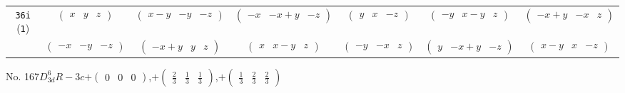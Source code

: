 \documentclass[fleqn,9pt,landscape]{jsarticle}
\begin{document}
\begin{center}
\begin{longtable}{ccccccc}
{\tt 36i} ({\tt 1}) & $ \begin{pmatrix} x & y & z \end{pmatrix} $ & $ \begin{pmatrix} x - y & - y & - z \end{pmatrix} $ & $ \begin{pmatrix} - x & - x + y & - z \end{pmatrix} $ & $ \begin{pmatrix} y & x & - z \end{pmatrix} $ & $ \begin{pmatrix} - y & x - y & z \end{pmatrix} $ & $ \begin{pmatrix} - x + y & - x & z \end{pmatrix} $ \\
& $ \begin{pmatrix} - x & - y & - z \end{pmatrix} $ & $ \begin{pmatrix} - x + y & y & z \end{pmatrix} $ & $ \begin{pmatrix} x & x - y & z \end{pmatrix} $ & $ \begin{pmatrix} - y & - x & z \end{pmatrix} $ & $ \begin{pmatrix} y & - x + y & - z \end{pmatrix} $ & $ \begin{pmatrix} x - y & x & - z \end{pmatrix} $ \\
\end{longtable}
\end{center}
\newpage
No. 167\quad$D_{3d}^{6}$\quad$R-3c$\quad[ trigonal ]\quad$+\begin{pmatrix} 0 & 0 & 0 \end{pmatrix}$,\quad $+\begin{pmatrix} \frac{2}{3} & \frac{1}{3} & \frac{1}{3} \end{pmatrix}$,\quad $+\begin{pmatrix} \frac{1}{3} & \frac{2}{3} & \frac{2}{3} \end{pmatrix}$
\end{document}
